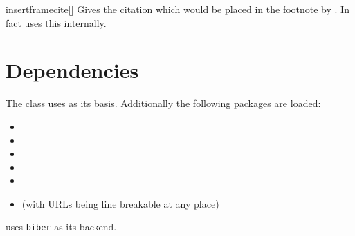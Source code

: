 \begin{describemacro}{insertframecite}[]
  Gives the citation which would be placed in the footnote by . In
  fact  uses this internally.
\end{describemacro}

\section{Dependencies}
The class uses  as its basis. Additionally the following packages
are loaded:
\vspace*{-\multicolsep}%
\begin{multicols}{2}
  \begin{itemize}[leftmargin=10pt]
    \item {}
    \item {}
    \item {}
    \item {}
    \item \TikZ
    \item {} (with URLs being line breakable at any place)
  \end{itemize}
\end{multicols}
\vspace*{-\multicolsep}%
\noindent{} uses \texttt{biber} as its backend.
